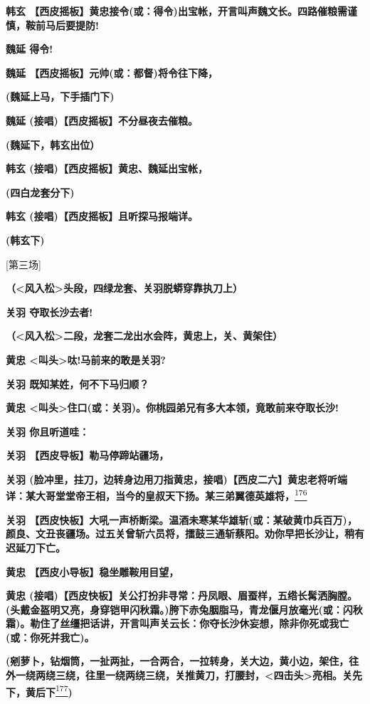 \textbf{韩玄
【西皮摇板】黄忠接令(或：得令)出宝帐，开言叫声魏文长。四路催粮需谨慎，鞍前马后要提防!}

\textbf{魏延 得令!}

\textbf{魏延 【西皮摇板】元帅(或：都督)将令往下降，}

\textbf{(魏延上马，下手插门下)}

\textbf{魏延 (接唱)【西皮摇板】不分昼夜去催粮。}

\textbf{(魏延下，韩玄出位）}

\textbf{韩玄 (接唱)【西皮摇板】黄忠、魏延出宝帐，}

\textbf{(四白龙套分下)}

\textbf{韩玄 (接唱)【西皮摇板】且听探马报端详。}

\textbf{(韩玄下)}

{[}第三场{]}

\textbf{（\textless{}风入松\textgreater{}头段，四绿龙套、关羽脱蟒穿靠执刀上）}

\textbf{关羽 夺取长沙去者!}

\textbf{（\textless{}风入松\textgreater{}二段，龙套二龙出水会阵，黄忠上，关、黄架住）}

\textbf{黄忠 \textless{}叫头\textgreater{}呔!马前来的敢是关羽?}

\textbf{关羽 既知某姓，何不下马归顺？}

\textbf{黄忠
\textless{}叫头\textgreater{}住口(或：关羽)。你桃园弟兄有多大本领，竟敢前来夺取长沙!}

\textbf{关羽 你且听道哇：}

\textbf{关羽 【西皮导板】勒马停蹄站疆场，}

\textbf{关羽
(脸冲里，拄刀，边转身边用刀指黄忠，接唱)【西皮二六】黄忠老将听端详：某大哥堂堂帝王相，当今的皇叔天下扬。某三弟翼德英雄将，}\protect\hyperlink{fn176}{\textsuperscript{176}}

\textbf{关羽
【西皮快板】大吼一声桥断梁。温酒未寒某华雄斩(或：某破黄巾兵百万)，颜良、文丑丧疆场。过五关曾斩六员将，擂鼓三通斩蔡阳。劝你早把长沙让，稍有迟延刀下亡。}

\textbf{黄忠 【西皮小导板】稳坐雕鞍用目望，}

\textbf{黄忠
(接唱)【西皮快板】关公打扮非寻常：丹凤眼、眉蚕样，五绺长髯洒胸膛。(头戴金盔明又亮，身穿铠甲闪秋霜。)胯下赤兔胭脂马，青龙偃月放毫光(或：闪秋霜)。勒住了丝缰把话讲，开言叫声关云长：你夺长沙休妄想，除非你死或我亡(或：你死并我亡)。}

\textbf{(剜萝卜，钻烟筒，一扯两扯，一合两合，一拉转身，关大边，黄小边，架住，往外一绕两绕三绕，往里一绕两绕三绕，关推黄刀，打腰封，\textless{}四击头\textgreater{}亮相。关先下，黄后下}\protect\hyperlink{fn177}{\textsuperscript{177}}\textbf{)}

